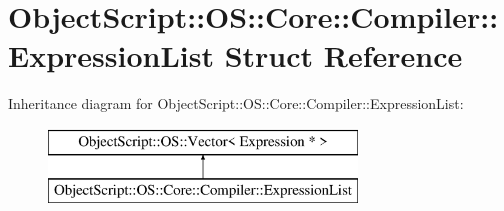 \hypertarget{struct_object_script_1_1_o_s_1_1_core_1_1_compiler_1_1_expression_list}{}\section{Object\+Script\+:\+:OS\+:\+:Core\+:\+:Compiler\+:\+:Expression\+List Struct Reference}
\label{struct_object_script_1_1_o_s_1_1_core_1_1_compiler_1_1_expression_list}
Inheritance diagram for Object\+Script\+:\+:OS\+:\+:Core\+:\+:Compiler\+:\+:Expression\+List\+:\begin{figure}[H]
\begin{center}
\leavevmode
\includegraphics[height=2.000000cm]{struct_object_script_1_1_o_s_1_1_core_1_1_compiler_1_1_expression_list}
\end{center}
\end{figure}
